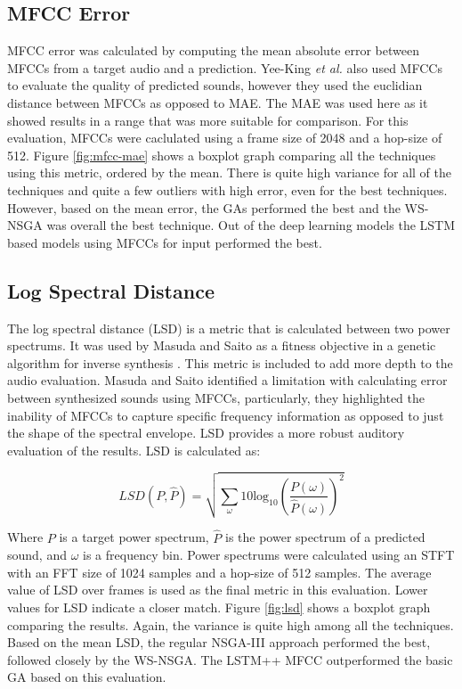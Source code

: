 \subsection{MFCC Error}
MFCC error was calculated by computing the mean absolute error between MFCCs from a target audio and a prediction. Yee-King \textit{et al.} \cite{yee2018automatic} also used MFCCs to evaluate the quality of predicted sounds, however they used the euclidian distance between MFCCs as opposed to MAE. The MAE was used here as it showed results in a range that was more suitable for comparison. For this evaluation, MFCCs were caclulated using a frame size of 2048 and a hop-size of 512. Figure \ref{fig:mfcc-mae} shows a boxplot graph comparing all the techniques using this metric, ordered by the mean. There is quite high variance for all of the techniques and quite a few outliers with high error, even for the best techniques. However, based on the mean error, the GAs performed the best and the WS-NSGA was overall the best technique. Out of the deep learning models the LSTM based models using MFCCs for input performed the best.

\subsection{Log Spectral Distance}
The log spectral distance (LSD) is a metric that is calculated between two power spectrums. It was used by Masuda and Saito as a fitness objective in a genetic algorithm for inverse synthesis \cite{masudo2021quality}. This metric is included to add more depth to the audio evaluation. Masuda and Saito identified a limitation with calculating error between synthesized sounds using MFCCs, particularly, they highlighted the inability of MFCCs to capture specific frequency information as opposed to just the shape of the spectral envelope. LSD provides a more robust auditory evaluation of the results. LSD is calculated as:

\begin{equation}
    LSD(P, \hat{P}) = \sqrt{\sum_{\omega}10\text{log}_{10}\left( \frac{P(\omega)}{\hat{P}(\omega)} \right)^2}
\end{equation}

Where $P$ is a target power spectrum, $\hat{P}$ is the power spectrum of a predicted sound, and $\omega$ is a frequency bin. Power spectrums were calculated using an STFT with an FFT size of 1024 samples and a hop-size of 512 samples. The average value of LSD over frames is used as the final metric in this evaluation. Lower values for LSD indicate a closer match. Figure \ref{fig:lsd} shows a boxplot graph comparing the results. Again, the variance is quite high among all the techniques. Based on the mean LSD, the regular NSGA-III approach performed the best, followed closely by the WS-NSGA. The LSTM++ MFCC outperformed the basic GA based on this evaluation.


